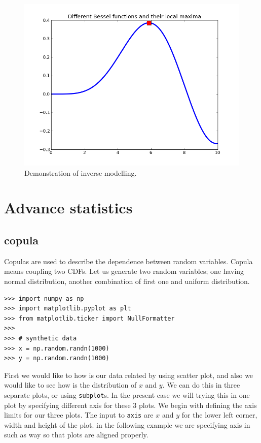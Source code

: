 \documentclass[10pt]{book}
\begin{document}
\beforefig
\begin{figure}[h!]
  \centering
    \includegraphics[scale=0.5]{images/inverse.png}
  \caption{Demonstration of inverse modelling.}
   \label{fig:inverse}
\end{figure}
\afterfig

\chapter{Advance statistics}

\section{copula}
Copulas are used to describe the dependence between random variables. Copula means coupling two CDFs. Let us generate two random variables; one having normal distribution, another combination of first one and uniform distribution.

\beforeverb \begin{verbatim}
>>> import numpy as np
>>> import matplotlib.pyplot as plt
>>> from matplotlib.ticker import NullFormatter
>>> 
>>> # synthetic data
>>> x = np.random.randn(1000)
>>> y = np.random.randn(1000)
\end{verbatim} \afterverb

First we would like to how is our data related by using scatter plot, and also we would like to see how is the distribution of $x$ and $y$. We can do this in three separate plots, or using \verb"subplot"s. In the present case we will trying this in one plot by specifying different axis for these 3 plots. We begin with defining the axis limits for our three plots. The input to \verb"axis" are $x$ and $y$ for the lower left corner, width and height of the plot. in the following example we are specifying axis in such as way so that plots are aligned properly. 
\end{document}

